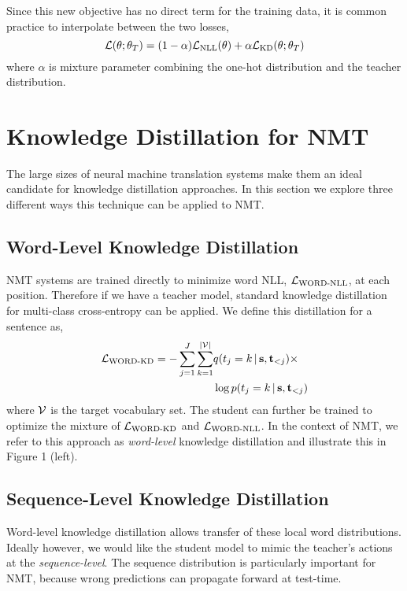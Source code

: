 \documentclass[11pt,letterpaper]{article}
\begin{document}
Since this new objective has no direct term for the training data,
it is common practice to interpolate between the two losses,
\begin{equation*}
\mathcal{L}(\theta;\theta_T) = (1-\alpha) \mathcal{L}_{\text{NLL}}(\theta) + \alpha \mathcal{L}_{\text{KD}}(\theta;\theta_T)
\end{equation*}
where $\alpha$ is mixture parameter combining the one-hot distribution and
the teacher distribution. 


\section{Knowledge Distillation for NMT} \label{seq-KD}

The large sizes of neural machine translation systems make them  an ideal candidate for 
knowledge distillation approaches. In this section we explore three different 
ways this technique can be applied to NMT.

\subsection{Word-Level Knowledge Distillation}

NMT systems are trained directly to minimize word NLL,
$\mathcal{L}_{\text{WORD-NLL}}$, at each position. Therefore 
if we have a teacher model, standard knowledge distillation 
for multi-class cross-entropy can be applied.
We define this distillation for a sentence as,
\begin{eqnarray*}
\mathcal{L}_{\text{WORD-KD}} = -\sum_{j=1}^{J} \sum_{k=1}^{|\mathcal{V}|} &q(t_{j}=k \,|\, \mathbf{s}, \mathbf{t}_{<j}) \times \\
&\log p(t_{j}=k \,|\, \mathbf{s}, \mathbf{t}_{<j})
\end{eqnarray*}
where $\mathcal{V}$ is the target vocabulary set. The student can further be trained to  optimize the
mixture of $\mathcal{L}_{\text{WORD-KD}}$ and $\mathcal{L}_{\text{WORD-NLL}}$.  In
the context of NMT, we refer to this approach as \textit{word-level}
knowledge distillation and illustrate this in Figure 1 (left).


\subsection{Sequence-Level Knowledge Distillation}

Word-level knowledge distillation allows transfer of these local word
distributions. Ideally however, we would like the student model to mimic the
teacher's actions at the \textit{sequence-level}.  The sequence
distribution is particularly important for NMT, because wrong
predictions can propagate forward at test-time.
\end{document}
